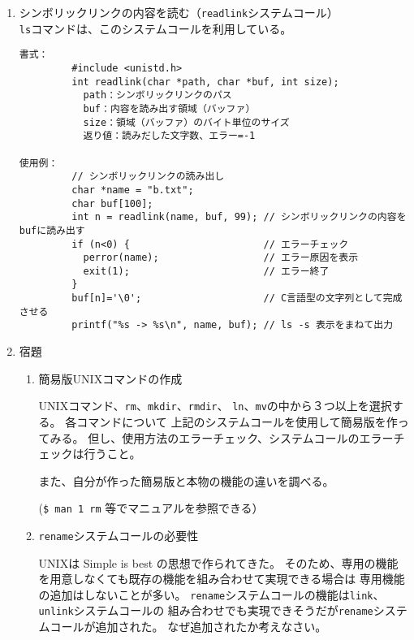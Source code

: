 \documentclass[a4j,dvipdfmx]{jarticle}
\begin{document}
\begin{enumerate}
\begin{lstlisting}[numbers=none]
\end{lstlisting}

\item シンボリックリンクの内容を読む（{\tt readlink}システムコール）\\
{\tt ls}コマンドは、このシステムコールを利用している。

\begin{lstlisting}[numbers=none]
書式：
         #include <unistd.h>
         int readlink(char *path, char *buf, int size);
           path：シンボリックリンクのパス
           buf：内容を読み出す領域（バッファ）
           size：領域（バッファ）のバイト単位のサイズ
           返り値：読みだした文字数、エラー=-1

使用例：
         // シンボリックリンクの読み出し
         char *name = "b.txt";
         char buf[100];
         int n = readlink(name, buf, 99); // シンボリックリンクの内容をbufに読み出す
         if (n<0) {                       // エラーチェック
           perror(name);                  // エラー原因を表示
           exit(1);                       // エラー終了
         }
         buf[n]='\0';                     // C言語型の文字列として完成させる
         printf("%s -> %s\n", name, buf); // ls -s 表示をまねて出力

\end{lstlisting}

\item 宿題

\begin{enumerate}
\item 簡易版UNIXコマンドの作成

UNIXコマンド、{\tt rm}、{\tt mkdir}、{\tt rmdir}、
{\tt ln}、{\tt mv}の中から３つ以上を選択する。
各コマンドについて
上記のシステムコールを使用して簡易版を作ってみる。
但し、使用方法のエラーチェック、システムコールのエラーチェックは行うこと。

また、自分が作った簡易版と本物の機能の違いを調べる。

(\verb/$ man 1 rm/ 等でマニュアルを参照できる）

\item {\tt rename}システムコールの必要性

UNIXは Simple is best の思想で作られてきた。
そのため、専用の機能を用意しなくても既存の機能を組み合わせて実現できる場合は
専用機能の追加はしないことが多い。
{\tt rename}システムコールの機能は{\tt link}、{\tt unlink}システムコールの
組み合わせでも実現できそうだが{\tt rename}システムコールが追加された。
なぜ追加されたか考えなさい。
\end{enumerate}
\end{enumerate}
\end{document}
